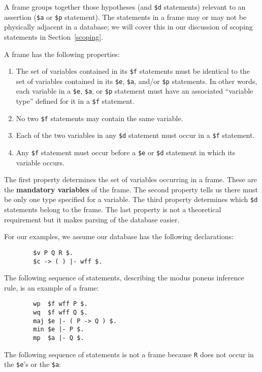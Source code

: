 A frame groups together those hypotheses (and \texttt{\$d} statements) relevant
to an assertion (\texttt{\$a} or \texttt{\$p} statement).  The statements in a frame
may or may not be physically adjacent in a database; we will cover
this in our discussion of scoping statements
in Section~\ref{scoping}.

A frame has the following properties:
\begin{enumerate}
 \item The set of variables contained in its \texttt{\$f} statements must
be identical to the set of variables contained in its \texttt{\$e},
\texttt{\$a}, and/or \texttt{\$p} statements.  In other words, each
variable in a \texttt{\$e}, \texttt{\$a}, or \texttt{\$p} statement must
have an associated ``variable type'' defined for it in a \texttt{\$f}
statement.
  \item No two \texttt{\$f} statements may contain the same variable.
  \item Each of the two variables in any \texttt{\$d} statement must occur in a
\texttt{\$f} statement.
  \item Any \texttt{\$f} statement
must occur before a \texttt{\$e} or \texttt{\$d} statement in which its variable
occurs.
\end{enumerate}

The first property determines the set of variables occurring in a frame.
These are the {\bf mandatory
variables} of the frame.  The second property
tells us there must be only one type specified for a variable.  The
third property determines which \texttt{\$d} statements belong to the
frame.  The last property is not a theoretical requirement but it
makes parsing of the database easier.

For our examples, we assume our database has the following declarations:

\begin{verbatim}
        $v P Q R $.
        $c -> ( ) |- wff $.
\end{verbatim}

The following sequence of statements, describing the modus ponens inference
rule, is an example of a frame:

\begin{verbatim}
        wp  $f wff P $.
        wq  $f wff Q $.
        maj $e |- ( P -> Q ) $.
        min $e |- P $.
        mp  $a |- Q $.
\end{verbatim}

The following sequence of statements is not a frame because \texttt{R} does not
occur in the \texttt{\$e}'s or the \texttt{\$a}:

